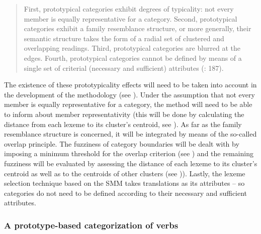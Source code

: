 \begin{quote}
First, prototypical categories exhibit degrees of typicality: not every member is equally representative for a category. Second, prototypical categories exhibit a family resemblance structure, or more generally, their semantic structure takes the form of a radial set of clustered and overlapping readings. Third, prototypical categories are blurred at the edges. Fourth, prototypical categories cannot be defined by means of a single set of criterial (necessary and sufficient) attributes (\citealt{geeraerts_theories_2010}: 187).
\end{quote}


The existence of these prototypicality effects will need to be taken into account in the development of the methodology (see ). Under the assumption that not every member is equally representative for a category, the method will need to be able to inform about member representativity (this will be done by calculating the distance from each lexeme to its cluster’s centroid, see ). As far as the family resemblance structure is concerned, it will be integrated by means of the so-called overlap principle. The fuzziness of category boundaries will be dealt with by imposing a minimum threshold for the overlap criterion (see ) and the remaining fuzziness will be evaluated by assessing the distance of each lexeme to its cluster’s centroid as well as to the centroids of other clusters (see )). Lastly, the lexeme selection technique based on the SMM takes translations as its attributes – so categories do not need to be defined according to their necessary and sufficient attributes.


\subsubsection{\label{sec:2.4.3.2}  A prototype-based categorization of verbs}

